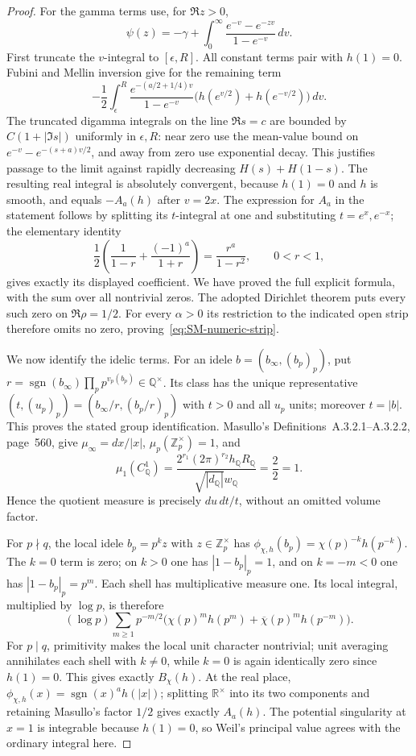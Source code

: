 \documentclass[11pt,a4paper]{article}
\theoremstyle{definition}\newtheorem{definition}[theorem]{Definition}
\theoremstyle{remark}\newtheorem{remark}[theorem]{Remark}
\begin{document}
\begin{proof}
For the gamma terms use, for $\Re z>0$,
\[
 \psi(z)=-\gamma+\int_0^\infty
                 \frac{e^{-v}-e^{-zv}}{1-e^{-v}}\,dv.
\]
First truncate the $v$-integral to $[\epsilon,R]$.  All constant terms
pair with $h(1)=0$.  Fubini and Mellin inversion give for the remaining
term
\[
 -\frac12\int_\epsilon^R
 \frac{e^{-(a/2+1/4)v}}{1-e^{-v}}
       \bigl(h(e^{v/2})+h(e^{-v/2})\bigr)\,dv.
\]
The truncated digamma integrals on the line $\Re s=c$ are bounded by
$C(1+|\Im s|)$ uniformly in $\epsilon,R$: near zero use the mean-value
bound on $e^{-v}-e^{-(s+a)v/2}$, and away from zero use exponential
decay.  This justifies passage to the limit against rapidly decreasing
$H(s)+H(1-s)$.  The resulting real integral is absolutely convergent,
because $h(1)=0$ and $h$ is smooth, and equals $-A_a(h)$ after $v=2x$.
The expression for $A_a$ in the statement follows by splitting its
$t$-integral at one and substituting $t=e^x,e^{-x}$; the elementary
identity
\[
 \frac12\left(\frac1{1-r}+\frac{(-1)^a}{1+r}\right)
       =\frac{r^a}{1-r^2},\qquad 0<r<1,
\]
gives exactly its displayed coefficient.  We have proved the full
explicit formula, with the sum over all nontrivial zeros.
The adopted Dirichlet theorem puts every such zero on $\Re\rho=1/2$.
For every $\alpha>0$ its restriction to the indicated open strip therefore
omits no zero, proving~\eqref{eq:SM-numeric-strip}.

We now identify the idelic terms.  For an idele $b=(b_\infty,(b_p)_p)$,
put $r=\operatorname{sgn}(b_\infty)\prod_p p^{v_p(b_p)}\in\mathbb Q^\times$.
Its class has the unique representative
$(t,(u_p)_p)=(b_\infty/r,(b_p/r)_p)$ with $t>0$ and all $u_p$ units;
moreover $t=|b|$.  This proves the stated group identification.
Masullo's Definitions~A.3.2.1--A.3.2.2, page~560, give
$\mu_\infty=dx/|x|$, $\mu_p(\mathbb Z_p^\times)=1$, and
\[
 \mu_1(C_{\mathbb Q}^1)=\frac{2^{r_1}(2\pi)^{r_2}h_{\mathbb Q}R_{\mathbb Q}}
 {\sqrt{|d_{\mathbb Q}|}w_{\mathbb Q}}=\frac{2}{2}=1.
\]
Hence the quotient measure is precisely $du\,dt/t$, without an omitted
volume factor.

For $p\nmid q$, the local idele $b_p=p^kz$ with
$z\in\mathbb Z_p^\times$ has
$\phi_{\chi,h}(b_p)=\chi(p)^{-k}h(p^{-k})$.  The $k=0$ term is zero;
on $k>0$ one has $|1-b_p|_p=1$, and on $k=-m<0$ one has
$|1-b_p|_p=p^m$.  Each shell has multiplicative measure one.  Its local
integral, multiplied by $\log p$, is therefore
\[
 (\log p)\sum_{m\geq1}p^{-m/2}
 \bigl(\chi(p)^m h(p^m)+\overline\chi(p)^m h(p^{-m})\bigr).
\]
For $p\mid q$, primitivity makes the local unit character nontrivial;
unit averaging annihilates each shell with $k\ne0$, while $k=0$ is again
identically zero since $h(1)=0$.  This gives exactly $B_\chi(h)$.
At the real place,
$\phi_{\chi,h}(x)=\operatorname{sgn}(x)^a h(|x|)$; splitting
$\mathbb R^\times$ into its two components and retaining Masullo's
factor $1/2$ gives exactly $A_a(h)$.  The potential singularity at $x=1$
is integrable because $h(1)=0$, so Weil's principal value agrees with the
ordinary integral here.


\end{proof}
\end{document}

